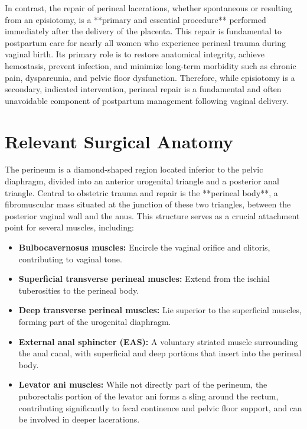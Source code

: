 In contrast, the repair of perineal lacerations, whether spontaneous or resulting from an episiotomy, is a **primary and essential procedure** performed immediately after the delivery of the placenta. This repair is fundamental to postpartum care for nearly all women who experience perineal trauma during vaginal birth. Its primary role is to restore anatomical integrity, achieve hemostasis, prevent infection, and minimize long-term morbidity such as chronic pain, dyspareunia, and pelvic floor dysfunction. Therefore, while episiotomy is a secondary, indicated intervention, perineal repair is a fundamental and often unavoidable component of postpartum management following vaginal delivery.

\section*{Relevant Surgical Anatomy}
The perineum is a diamond-shaped region located inferior to the pelvic diaphragm, divided into an anterior urogenital triangle and a posterior anal triangle. Central to obstetric trauma and repair is the **perineal body**, a fibromuscular mass situated at the junction of these two triangles, between the posterior vaginal wall and the anus. This structure serves as a crucial attachment point for several muscles, including:

\begin{itemize}
  \item \textbf{Bulbocavernosus muscles:} Encircle the vaginal orifice and clitoris, contributing to vaginal tone.
  \item \textbf{Superficial transverse perineal muscles:} Extend from the ischial tuberosities to the perineal body.
  \item \textbf{Deep transverse perineal muscles:} Lie superior to the superficial muscles, forming part of the urogenital diaphragm.
  \item \textbf{External anal sphincter (EAS):} A voluntary striated muscle surrounding the anal canal, with superficial and deep portions that insert into the perineal body.
  \item \textbf{Levator ani muscles:} While not directly part of the perineum, the puborectalis portion of the levator ani forms a sling around the rectum, contributing significantly to fecal continence and pelvic floor support, and can be involved in deeper lacerations.
\end{itemize}

